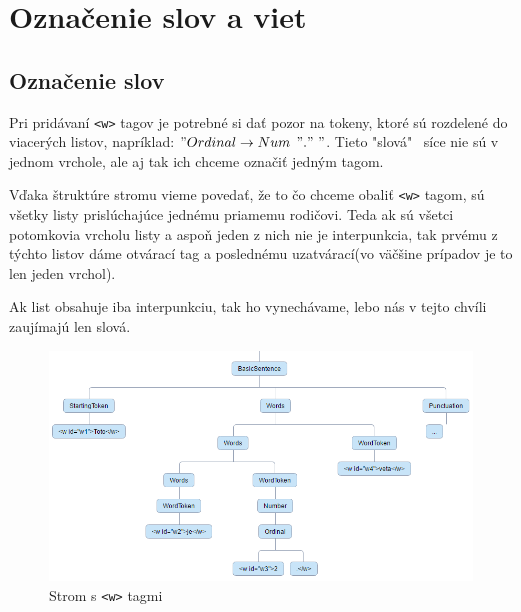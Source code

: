 \documentclass[12pt,a4paper]{report}
\theoremstyle{definition}
\theoremstyle{remark}
\begin{document}
\section{Označenie slov a viet}
\subsection{Označenie slov}
Pri pridávaní \verb!<w>! tagov je potrebné si dať pozor na tokeny, ktoré sú rozdelené do viacerých listov, napríklad: $"Ordinal \to Num $ $ "." \ "$. Tieto "slová"  \ síce nie sú v jednom vrchole, ale aj tak ich chceme označiť jedným tagom.

Vďaka štruktúre stromu vieme povedať, že to čo chceme obaliť \verb!<w>! tagom, sú všetky listy prislúchajúce jednému priamemu rodičovi. Teda ak sú všetci potomkovia vrcholu listy a aspoň jeden z nich nie je interpunkcia, tak prvému z týchto listov dáme otvárací tag a poslednému uzatvárací(vo väčšine prípadov je to len jeden vrchol).


Ak list obsahuje iba interpunkciu, tak ho vynechávame, lebo nás v tejto chvíli zaujímajú len slová.

\begin{figure}[H]
\centering
\includegraphics[scale=2]{treeWordsAdded}
\caption{Strom s \texttt{<w>} tagmi}
\end{figure}
\end{document}
